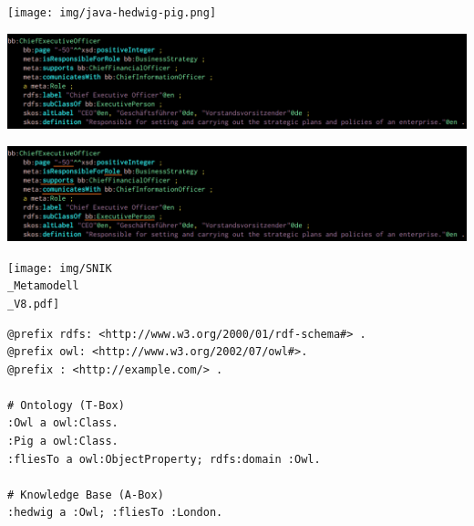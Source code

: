 \documentclass[14pt,aspectratio=1610]{beamer}
\begin{document}
\begin{frame}{}
\centering\texttt{[image: img/java-hedwig-pig.png]}
\end{frame}

\begin{frame}{}
\centering\includegraphics[width=1.05\textwidth,height=1.05\textheight,keepaspectratio]{img/bb-ceo.png}
\end{frame}

\begin{frame}{}
\centering\includegraphics[width=1.05\textwidth,height=1.05\textheight,keepaspectratio]{img/bb-ceo-marked.png}
\end{frame}

\begin{frame}{}
\centering\texttt{[image: img/SNIK\\\_Metamodell\\\_V8.pdf]}
\end{frame}

%

\begin{frame}[fragile]{}
\small
\begin{lstlisting}
@prefix rdfs: <http://www.w3.org/2000/01/rdf-schema#> .
@prefix owl: <http://www.w3.org/2002/07/owl#>.
@prefix : <http://example.com/> .

# Ontology (T-Box)
:Owl a owl:Class.
:Pig a owl:Class.
:fliesTo a owl:ObjectProperty; rdfs:domain :Owl.

# Knowledge Base (A-Box)
:hedwig a :Owl; :fliesTo :London.
\end{lstlisting}
\end{frame}
\end{document}
